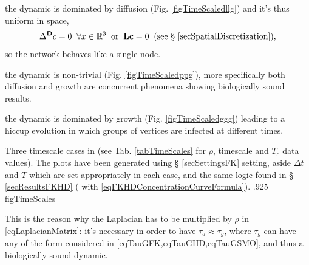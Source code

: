 \documentclass{article}
\begin{document}
                \begin{description}[
                    style=unboxed,
                    topsep=7.5pt,	  %
                    itemsep=0pt,	  %
                    leftmargin=25pt,  %
                    rightmargin=0pt, %
                    itemindent=!,
                    labelindent=10pt, %
                    labelwidth=!,
                    labelsep=5pt,
                ] %
                    \item[$\tau_d\ll\tau_g$:] the dynamic is dominated by diffusion (Fig. \ref{figTimeScaledllg}) and it's thus uniform in space, \ie{} \[\Delta^{\mathbf D} c=0\;\;\forall x\in\mathbb R^3\;\;\text{or}\;\;\mathbf L\mathbf c=0\;\;\text{(see § \ref{secSpatialDiscretization})},\]so the network behaves like a single node.
                    \item[$\tau_d\approx\tau_g$:] the dynamic is non-trivial (Fig. \ref{figTimeScaledppg}), more specifically both diffusion and growth are concurrent phenomena showing biologically sound results.
                    \item[$\tau_d\gg\tau_g$:] the dynamic is dominated by growth (Fig. \ref{figTimeScaledggg}) leading to a hiccup evolution in which groups of vertices are infected at different times.
                \end{description}

                    {}
                    {Three timescale cases in \FKdiscrete{} (see Tab. \ref{tabTimeScales} for $\rho$, timescale and $T_c$ data values). The plots have been generated using § \ref{secSettingsFK} setting, aside $\Delta t$ and $T$ which are set appropriately in each case, and the same logic found in § \ref{secResultsFKHD} (\ie{} with \eqref{eqFKHDConcentrationCurveFormula}).}
                    {.925\linewidth}
                    {figTimeScales}

                This is the reason why the Laplacian has to be multiplied by $\rho$ in \eqref{eqLaplacianMatrix}: it's necessary in order to have $\tau_d\approx\tau_g$, where $\tau_g$ can have any of the form considered in \cref{eqTauGFK,eqTauGHD,eqTauGSMO}, and thus a biologically sound dynamic.
\end{document}

